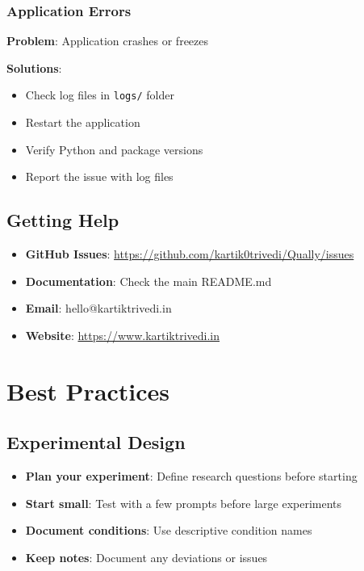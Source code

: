 \documentclass[11pt,a4paper]{article}
\begin{document}
\subsubsection{Application Errors}
\textbf{Problem}: Application crashes or freezes

\textbf{Solutions}:
\begin{itemize}
    \item Check log files in \texttt{logs/} folder
    \item Restart the application
    \item Verify Python and package versions
    \item Report the issue with log files
\end{itemize}

\subsection{Getting Help}
\begin{itemize}
    \item \textbf{GitHub Issues}: \url{https://github.com/kartik0trivedi/Qually/issues}
    \item \textbf{Documentation}: Check the main README.md
    \item \textbf{Email}: hello@kartiktrivedi.in
    \item \textbf{Website}: \url{https://www.kartiktrivedi.in}
\end{itemize}

\section{Best Practices}
\label{sec:best_practices}

\subsection{Experimental Design}
\begin{itemize}
    \item \textbf{Plan your experiment}: Define research questions before starting
    \item \textbf{Start small}: Test with a few prompts before large experiments
    \item \textbf{Document conditions}: Use descriptive condition names
    \item \textbf{Keep notes}: Document any deviations or issues
\end{itemize}
\end{document}
